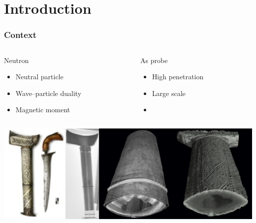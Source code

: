 
\section{Introduction}
\begin{frame}
  \frametitle{Context}
  \begin{columns}
    \begin{column}{0.45\textwidth}
      \begin{block}{Neutron}
        \begin{itemize}
          \item Neutral particle
          \item Wave–particle duality
          \item Magnetic moment
        \end{itemize}
      \end{block}
    \end{column}
    \begin{column}{0.45\textwidth}
      \begin{block}{As probe}
        \begin{itemize}
          \item High penetration
          \item Large scale
          \item 
        \end{itemize}
      \end{block}
    \end{column}
  \end{columns}
  \includegraphics[width=\textwidth]{01_Neutron/fig/fig000_Dague.png}
\end{frame}

